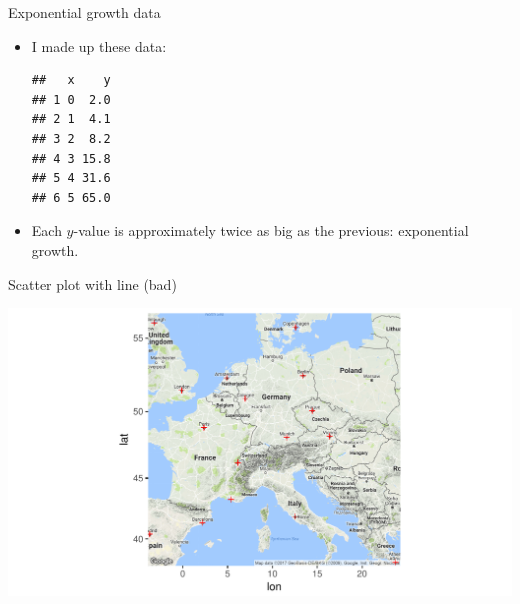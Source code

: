 \begin{frame}[fragile]{Exponential growth data}
  
  \begin{itemize}
  \item I made up these data:
\begin{knitrout}
\color{fgcolor}\begin{kframe}
\begin{alltt}
\hlkwb{=}\hlopt{:}
\hlkwb{=}\hlstd{(}\hlstd{,}\hlstd{,}\hlstd{,}\hlstd{,}\hlstd{,}\hlstd{)}
\hlkwb{=}
\end{alltt}
\begin{verbatim}
##   x    y
## 1 0  2.0
## 2 1  4.1
## 3 2  8.2
## 4 3 15.8
## 5 4 31.6
## 6 5 65.0
\end{verbatim}
\end{kframe}
\end{knitrout}

\item Each $y$-value is approximately twice as big as the previous:
  exponential growth.
  \end{itemize}
  
\end{frame}

\begin{frame}[fragile]{Scatter plot with line (bad)}
  
\begin{knitrout}
\color{fgcolor}\begin{kframe}
\begin{alltt}
\hlstd{(}\hlopt{+}
  \hlstd{()}\hlopt{+}\hlstd{(}\hlstd{=}\hlstd{)}
\end{alltt}
\end{kframe}
\includegraphics[width=\maxwidth]{figure/unnamed-chunk-16-1} 

\end{knitrout}
  
\end{frame}

